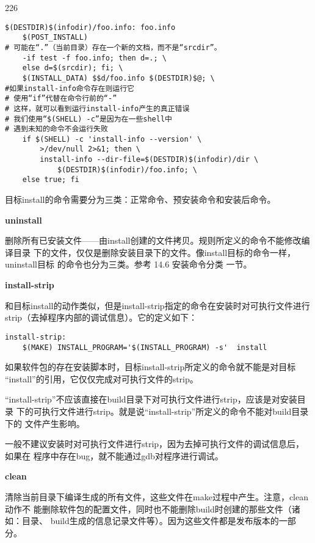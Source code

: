 \begin{dinglist}{226}
\begin{Verbatim}[]
$(DESTDIR)$(infodir)/foo.info: foo.info
    $(POST_INSTALL)
# 可能在“.”（当前目录）存在一个新的文档，而不是“srcdir”。
    -if test -f foo.info; then d=.; \
    else d=$(srcdir); fi; \
    $(INSTALL_DATA) $$d/foo.info $(DESTDIR)$@; \
#如果install-info命令存在则运行它
# 使用“if”代替在命令行前的“-”
# 这样，就可以看到运行install-info产生的真正错误
# 我们使用“$(SHELL) -c”是因为在一些shell中
# 遇到未知的命令不会运行失败
    if $(SHELL) -c 'install-info --version' \
        >/dev/null 2>&1; then \
        install-info --dir-file=$(DESTDIR)$(infodir)/dir \
            $(DESTDIR)$(infodir)/foo.info; \
    else true; fi
\end{Verbatim}

目标install的命令需要分为三类：正常命令、预安装命令和安装后命令。

\item \textbf{uninstall}

删除所有已安装文件——由install创建的文件拷贝。规则所定义的命令不能修改编译目录
下的文件，仅仅是删除安装目录下的文件。像install目标的命令一样，uninstall目标
的命令也分为三类。参考 14.6 安装命令分类 一节。

\item \textbf{install-strip}

和目标install的动作类似，但是install-strip指定的命令在安装时对可执行文件进行
strip（去掉程序内部的调试信息）。它的定义如下：

\begin{Verbatim}[]
install-strip:
    $(MAKE) INSTALL_PROGRAM='$(INSTALL_PROGRAM) -s'  install
\end{Verbatim}

如果软件包的存在安装脚本时，目标install-strip所定义的命令就不能是对目标
“install”的引用，它仅仅完成对可执行文件的strip。

“install-strip”不应该直接在build目录下对可执行文件进行strip，应该是对安装目录
下的可执行文件进行strip。就是说“install-strip”所定义的命令不能对build目录下的
文件产生影响。

一般不建议安装时对可执行文件进行strip，因为去掉可执行文件的调试信息后，如果在
程序中存在bug，就不能通过gdb对程序进行调试。


\item \textbf{clean}

清除当前目录下编译生成的所有文件，这些文件在make过程中产生。注意，clean动作不
能删除软件包的配置文件，同时也不能删除build时创建的那些文件（诸如：目录、
build生成的信息记录文件等）。因为这些文件都是发布版本的一部分。


\end{dinglist}
